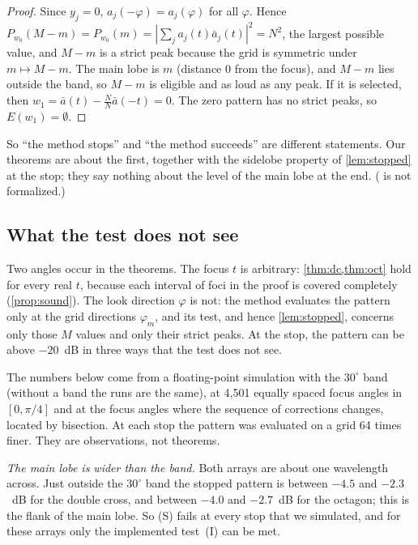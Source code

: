 \documentclass[11pt]{amsart}
\theoremstyle{plain}
\theoremstyle{definition}
\newcommand{\ab}{\bar a}
\newcommand{\El}{E}
\begin{document}
\begin{proof}
Since $y_j = 0$, $a_j(-\varphi) = a_j(\varphi)$ for all $\varphi$.  Hence
$P_{w_0}(M-m) = P_{w_0}(m) = |\sum_j a_j(t)\ab_j(t)|^2 = N^2$, the largest possible value, and
$M - m$ is a strict peak because the grid is symmetric under $m \mapsto M - m$.  The main lobe is
$m$ (distance $0$ from the focus), and $M - m$ lies outside the band, so $M - m$ is eligible and
as loud as any peak.  If it is selected, then $w_1 = \ab(t) - \frac{N}{N}\ab(-t) = 0$.  The zero
pattern has no strict peaks, so $\El(w_1) = \emptyset$.
\end{proof}

So ``the method stops'' and ``the method succeeds'' are different statements.  Our theorems are about
the first, together with the sidelobe property of \cref{lem:stopped} at the stop; they say nothing
about the level of the main lobe at the end.  ( is not formalized.)

\subsection{What the test does not see}\label{sec:unseen}

Two angles occur in the theorems.  The focus $t$ is arbitrary: \cref{thm:dc,thm:oct} hold for every
real $t$, because each interval of foci in the proof is covered completely (\cref{prop:sound}).  The
look direction $\varphi$ is not: the method evaluates the pattern only at the grid directions
$\varphi_m$, and its test, and hence \cref{lem:stopped}, concerns only those $M$ values and only
their strict peaks.  At the stop, the pattern can be above $-20$~dB in three ways that the test does
not see.

The numbers below come from a floating-point simulation with the $30^\circ$ band (without a band the
runs are the same), at 4{,}501 equally spaced focus angles in $[0, \pi/4]$ and at the focus angles
where the sequence of corrections changes, located by bisection.  At each stop the pattern was
evaluated on a grid 64 times finer.  They are observations, not theorems.

\emph{The main lobe is wider than the band.}  Both arrays are about one wavelength across.  Just
outside the $30^\circ$ band the stopped pattern is between $-4.5$ and $-2.3$~dB for the double cross,
and between $-4.0$ and $-2.7$~dB for the octagon; this is the flank of the main lobe.  So (S) fails at
every stop that we simulated, and for these arrays only the implemented test~(I) can be met.
\end{document}
